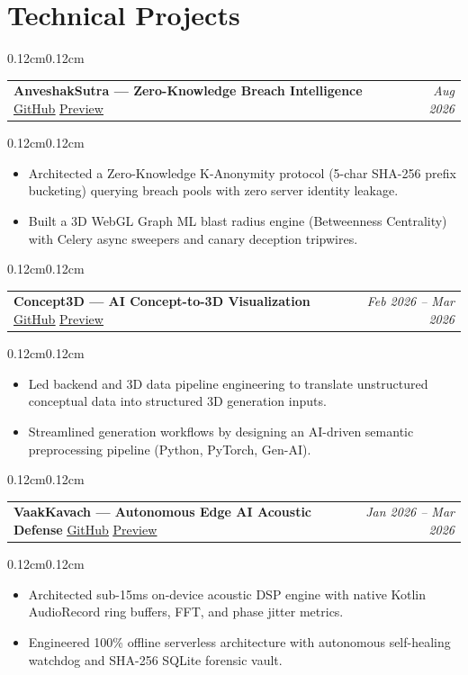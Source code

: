 \documentclass[10pt, letterpaper]{article}
\makeatletter
\newenvironment{onecolentry}
{\begin{adjustwidth}{0.12cm}{0.12cm}}
{\end{adjustwidth}}
\newenvironment{twocolentry}
{\begin{adjustwidth}{0.12cm}{0.12cm}
\begin{tabular*}{\linewidth}{l @{\extracolsep{\fill}} r}}
{\end{tabular*}
\end{adjustwidth}}
\newenvironment{highlights}
{\begin{itemize}[leftmargin=0.36cm, itemsep=0pt, topsep=1pt]}
{\end{itemize}}
\makeatother
\begin{document}
\section{Technical Projects}

\begin{twocolentry}
\textbf{AnveshakSutra — Zero-Knowledge Breach Intelligence} \quad \href{https://github.com/GuruMachanica/AnveshakSutra}{\underline{GitHub}} \quad \href{https://anveshak-sutra.vercel.app/}{\underline{Preview}} & \textit{Aug 2026}
\end{twocolentry}
\begin{onecolentry}
\begin{highlights}
\item Architected a Zero-Knowledge K-Anonymity protocol (5-char SHA-256 prefix bucketing) querying breach pools with zero server identity leakage.
\item Built a 3D WebGL Graph ML blast radius engine (Betweenness Centrality) with Celery async sweepers and canary deception tripwires.
\end{highlights}
\end{onecolentry}

\begin{twocolentry}
\textbf{Concept3D — AI Concept-to-3D Visualization} \quad \href{https://github.com/GuruMachanica/Concept-3D}{\underline{GitHub}} \quad \href{https://concept-3d.vercel.app/}{\underline{Preview}} & \textit{Feb 2026 – Mar 2026}
\end{twocolentry}
\begin{onecolentry}
\begin{highlights}
\item Led backend and 3D data pipeline engineering to translate unstructured conceptual data into structured 3D generation inputs.
\item Streamlined generation workflows by designing an AI-driven semantic preprocessing pipeline (Python, PyTorch, Gen-AI).
\end{highlights}
\end{onecolentry}

\begin{twocolentry}
\textbf{VaakKavach — Autonomous Edge AI Acoustic Defense} \quad \href{https://github.com/GuruMachanica/VaakKavach}{\underline{GitHub}} \quad \href{https://vaakkavach.netlify.app/}{\underline{Preview}} & \textit{Jan 2026 – Mar 2026}
\end{twocolentry}
\begin{onecolentry}
\begin{highlights}
\item Architected sub-15ms on-device acoustic DSP engine with native Kotlin AudioRecord ring buffers, FFT, and phase jitter metrics.
\item Engineered 100\% offline serverless architecture with autonomous self-healing watchdog and SHA-256 SQLite forensic vault.
\end{highlights}
\end{onecolentry}
\end{document}

